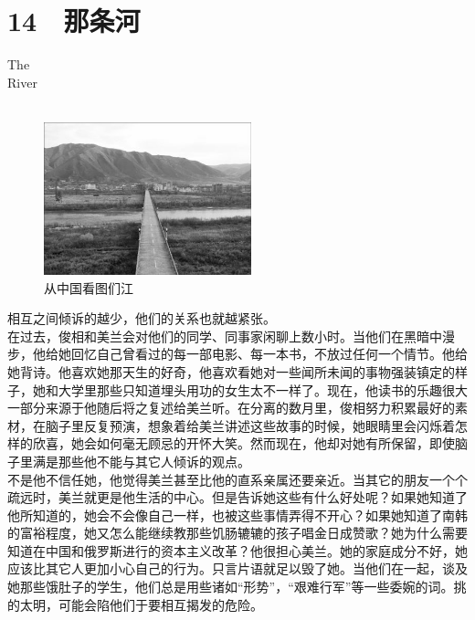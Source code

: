 \fancyhead[RO]{{\tiny{\textcolor{Gray}{\FA \ }}}\thepage}
\fancyhead[LE]{{\tiny{\textcolor{Gray}{\FA \ }}}\thepage}
\fancyfoot[LE,RO]{}
\fancyfoot[LO,CE]{}
\fancyfoot[CO,RE]{}
\chapter*{14 {\FA } 那条河}
\vspace{5mm}
\begin{flushright}
	\textcolor{PinYinColor}{\EN \huge{The\\
	River\\
	\ \\}}
\end{flushright}
\begin{figure}[!htbp]
\centering
\includegraphics[width=6cm]{./Chapters/Images/14.jpg}
\caption*{从中国看图们江}
\end{figure}


相互之间倾诉的越少，他们的关系也就越紧张。\\

在过去，俊相和美兰会对他们的同学、同事家闲聊上数小时。当他们在黑暗中漫步，他给她回忆自己曾看过的每一部电影、每一本书，不放过任何一个情节。他给她背诗。他喜欢她那天生的好奇，他喜欢看她对一些闻所未闻的事物强装镇定的样子，她和大学里那些只知道埋头用功的女生太不一样了。现在，他读书的乐趣很大一部分来源于他随后将之复述给美兰听。在分离的数月里，俊相努力积累最好的素材，在脑子里反复预演，想象着给美兰讲述这些故事的时候，她眼睛里会闪烁着怎样的欣喜，她会如何毫无顾忌的开怀大笑。然而现在，他却对她有所保留，即使脑子里满是那些他不能与其它人倾诉的观点。\\

不是他不信任她，他觉得美兰甚至比他的直系亲属还要亲近。当其它的朋友一个个疏远时，美兰就更是他生活的中心。但是告诉她这些有什么好处呢？如果她知道了他所知道的，她会不会像自己一样，也被这些事情弄得不开心？如果她知道了南韩的富裕程度，她又怎么能继续教那些饥肠辘辘的孩子唱金日成赞歌？她为什么需要知道在中国和俄罗斯进行的资本主义改革？他很担心美兰。她的家庭成分不好，她应该比其它人更加小心自己的行为。只言片语就足以毁了她。当他们在一起，谈及她那些饿肚子的学生，他们总是用些诸如“形势”，“艰难行军”等一些委婉的词。挑的太明，可能会陷他们于要相互揭发的危险。\\


